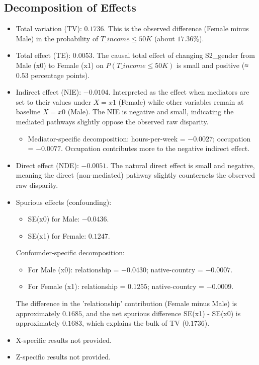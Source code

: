 \documentclass{article}
\begin{document}
\subsection*{Decomposition of Effects}
\begin{itemize}
  \item Total variation (TV): $0.1736$. This is the observed difference (Female minus Male) in the probability of $T\_income \leq 50K$ (about $17.36\%$).
  \item Total effect (TE): $0.0053$. The causal total effect of changing S2\_gender from Male (x0) to Female (x1) on $P(T\_income \leq 50K)$ is small and positive (≈ $0.53$ percentage points).
  \item Indirect effect (NIE): $-0.0104$. Interpreted as the effect when mediators are set to their values under $X=x1$ (Female) while other variables remain at baseline $X=x0$ (Male). The NIE is negative and small, indicating the mediated pathways slightly oppose the observed raw disparity.
    \begin{itemize}
      \item Mediator-specific decomposition: hours-per-week = $-0.0027$; occupation = $-0.0077$. Occupation contributes more to the negative indirect effect.
    \end{itemize}
  \item Direct effect (NDE): $-0.0051$. The natural direct effect is small and negative, meaning the direct (non-mediated) pathway slightly counteracts the observed raw disparity.
  \item Spurious effects (confounding):
    \begin{itemize}
      \item SE(x0) for Male: $-0.0436$.
      \item SE(x1) for Female: $0.1247$.
    \end{itemize}
    Confounder-specific decomposition:
    \begin{itemize}
      \item For Male (x0): relationship = $-0.0430$; native-country = $-0.0007$.
      \item For Female (x1): relationship = $0.1255$; native-country = $-0.0009$.
    \end{itemize}
    The difference in the 'relationship' contribution (Female minus Male) is approximately $0.1685$, and the net spurious difference SE(x1) - SE(x0) is approximately $0.1683$, which explains the bulk of TV ($0.1736$).
  \item X-specific results not provided.
  \item Z-specific results not provided.
\end{itemize}
\end{document}

